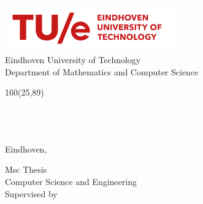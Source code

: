 \begin{titlepage}
	\begin{center}
		\includegraphics[height=2cm]{tue-logo-high.png} \\
		\LARGE
		Eindhoven University of Technology \\
		\Large
		Department of Mathematics and Computer Science\\
		\large
		\researchgroup
		
		\vspace*{10cm}
		
		\setlength{\TPHorizModule}{1mm}
		\setlength{\TPVertModule}{\TPHorizModule}
		
		\newlength{\backupparindent}
		\setlength{\backupparindent}{\parindent}
		\setlength{\parindent}{0mm}
		
		\begin{textblock}{160}(25,89)
			\begin{center}
				\vspace*{1mm}
				\huge
				\textbf{\doctitle \\}
				\Large
				\vspace*{5mm}
				\textit{\docsubtitle} \\%
				\vspace*{5mm}%
				\Large%
				\authorone\\
				\bigskip
				Eindhoven, \monthYear \\
			\end{center}
		\end{textblock}
		
		\large
		\vfill
		Msc Thesis\\
		Computer Science and Engineering\\
		\bigskip
		Supervised by \firstCommitteeMember\\
		
		\setlength{\parindent}{\backupparindent}
	\end{center}
\end{titlepage} 